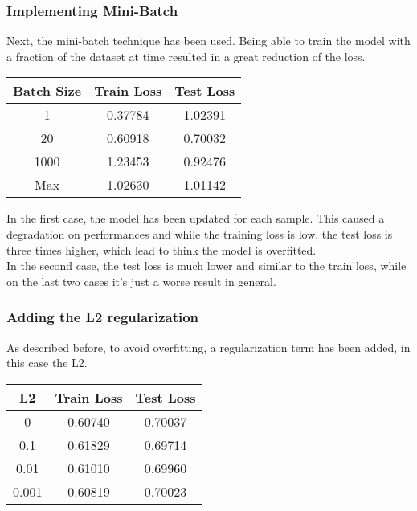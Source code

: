\documentclass[
	letterpaper, %
	10pt, %
]{class}
\begin{document}
\subsubsection{Implementing Mini-Batch}

Next, the mini-batch technique has been used. Being able to train the model with a fraction of the dataset at time resulted in a great reduction of the loss.

\begin{center}
	\begin{tabular}{ |c|c|c| }
		\hline
		Batch Size & Train Loss & Test Loss \\
		\hline
		1          & 0.37784    & 1.02391   \\
		20         & 0.60918    & 0.70032   \\
		1000       & 1.23453    & 0.92476   \\
		Max        & 1.02630    & 1.01142   \\
		\hline
	\end{tabular}
\end{center}

In the first case, the model has been updated for each sample. This caused a degradation on performances and while the training loss is low, the test loss is three times higher, which lead to think the model is overfitted.\\

In the second case, the test loss is much lower and similar to the train loss, while on the last two cases it's just a worse result in general.

\subsubsection{Adding the L2 regularization}

As described before, to avoid overfitting, a regularization term has been added, in this case the L2.

\begin{center}
	\begin{tabular}{ |c|c|c| }
		\hline
		L2    & Train Loss & Test Loss \\
		\hline
		0     & 0.60740    & 0.70037   \\
		0.1   & 0.61829    & 0.69714   \\
		0.01  & 0.61010    & 0.69960   \\
		0.001 & 0.60819    & 0.70023   \\
		\hline
	\end{tabular}
\end{center}
\end{document}

